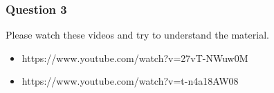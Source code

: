\documentclass[margin=1in]{article}
\begin{document}
		
		\pagebreak
		\subsubsection*{Question 3}
		Please watch these videos and try to understand the material.
		
		\begin{itemize}
		\item	https://www.youtube.com/watch?v=27vT-NWuw0M 
		\item https://www.youtube.com/watch?v=t-n4a18AW08
		
	\end{itemize}
		
    
	
\end{document}
